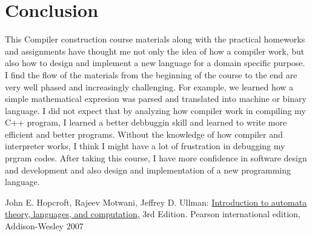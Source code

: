 \documentclass{article}
\theoremstyle{theorem}
\theoremstyle{definition}
\theoremstyle{remark}
\begin{document}
\section{Conclusion}
This Compiler construction course materials along with the practical homeworks and assignments have thought me not only the idea of how a compiler work, but also how to design and implement a new language for a domain specific purpose. I find the flow of the materials from the beginning of the course to the end are very well phased and increasingly challenging.  For example, we learned how a simple mathematical expresion was parsed and translated into machine or binary language. I did not expect that by analyzing how compiler work in compiling my C++ program, I learned a better debbuggin skill and learned to write more efficient and better programs. Without the knowledge of how compiler and interpreter works, I think I might have a lot of frustration in debugging my prgram codes. After taking this course, I have  more confidence in software design and development and also design and implementation of a new programming language.  


\begin{thebibliography}{99}
	John E. Hopcroft, Rajeev Motwani, Jeffrey D. Ullman:
\href{http://ce.sharif.edu/courses/94-95/1/ce414-2/resources/root/Text%20Books/Automata/John%20E.%20Hopcroft,%20Rajeev%20Motwani,%20Jeffrey%20D.%20Ullman-Introduction%20to%20Automata%20Theory,%20Languages,%20and%20Computations-Prentice%20Hall%20(2006).pdf}{Introduction to automata theory, languages, and computation,} 3rd Edition. Pearson international edition, Addison-Wesley 2007

\end{thebibliography}
\end{document}
